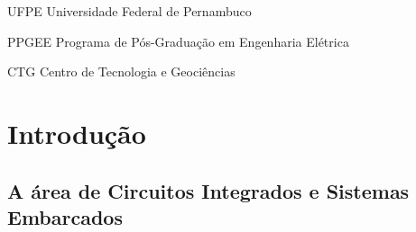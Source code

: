 \documentclass[
	12pt,				%
	openright,			%
  oneside,     %
	a4paper,			%
	english,			%
	french,				%
	spanish,			%
	brazil				%
	]{abntex2}
\begin{document}
\newpage


\frenchspacing 

\listoffigures*
\cleardoublepage

\listoftables*
\cleardoublepage

\begin{siglas}
\item[UFPE] Universidade Federal de Pernambuco
\item[PPGEE] Programa de Pós-Graduação em Engenharia Elétrica
\item[CTG] Centro de Tecnologia e Geociências
\end{siglas}


\tableofcontents*
\cleardoublepage



\textual

\chapter*[Introdução]{Introdução}

\section*{A área de Circuitos Integrados e Sistemas Embarcados}
\end{document}
